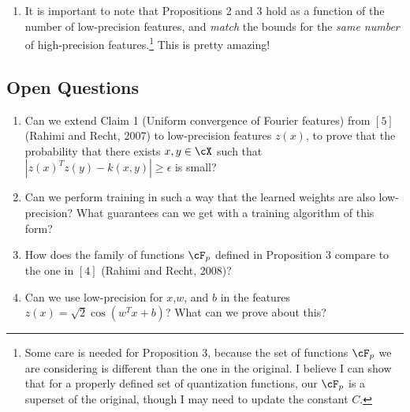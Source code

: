 \documentclass[12pt]{article}
\newcommand{\sq}{\sqrt{2}}
\newcommand{\eps}{\epsilon}
\begin{document}
\begin{enumerate}
\begin{center}
\end{center}
%
%



\item It is important to note that Propositions 2 and 3 hold as a function of the number of low-precision features, and \textit{match} the bounds for the \textit{same number} of high-precision features.\footnote{Some care is needed for Proposition 3, because the set of functions $\cF_p$ we are considering is different than the one in the original.  I believe I can show that for a properly defined set of quantization functions, our $\cF_p$ is a superset of the original, though I may need to update the constant $C$.}  This is pretty amazing!
\end{enumerate}

\subsection{Open Questions}
\begin{enumerate}
	\item Can we extend Claim 1 (Uniform convergence of Fourier features) from $[5]$ (Rahimi and Recht, 2007) to low-precision features $z(x)$, to prove that the probability that there exists $x,y\in\cX$ such that $|z(x)^Tz(y) -k(x,y)| \geq \eps$ is small?
	\item Can we perform training in such a way that the learned weights are also low-precision?  What guarantees can we get with a training algorithm of this form?
	\item How does the family of functions $\cF_p$ defined in Proposition 3 compare to the one in $[4]$ (Rahimi and Recht, 2008)?	
	\item Can we use low-precision for $x$,$w$, and $b$ in the features $z(x) = \sq\cos(w^Tx+b)$?  What can we prove about this?
\end{enumerate}
\end{document}
